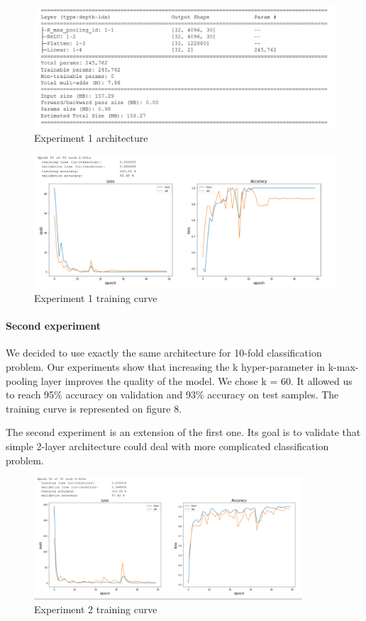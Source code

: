\documentclass[12pt, twoside]{article}
\begin{document}
\begin{figure}[htp]
    \centering
    \includegraphics[width=12cm]{figures/figure6.pdf}
    \caption{Experiment 1 architecture}
\end{figure}
\begin{figure}[htp]
    \centering
    \includegraphics[width=18cm]{figures/figure7.pdf}
    \caption{Experiment 1 training curve}
\end{figure}

\paragraph{Second experiment}
\noindent
We decided to use exactly the same architecture for 10-fold classification problem. Our experiments show that increasing the k hyper-parameter in k-max-pooling layer improves the quality of the model. We chose k = 60. It allowed us to reach 95\% accuracy on validation and 93\% accuracy on test samples. The training curve is represented on figure 8.   

The second experiment is an extension of the first one. Its goal is to validate that simple 2-layer architecture could deal with more complicated classification problem.

\begin{figure}[htp]
    \centering
    \includegraphics[width=10cm]{figures/figure8.pdf}
    \caption{Experiment 2 training curve}
\end{figure}
\end{document}
